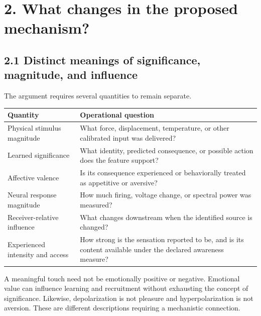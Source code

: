 \documentclass[
  american,
  11pt,
  letterpaper,
]{article}
\newcounter{none} %
\begin{document}
\section{2. What changes in the proposed mechanism?}\label{what-changes-in-the-proposed-mechanism}

\subsection{2.1 Distinct meanings of significance, magnitude, and influence}\label{distinct-meanings-of-significance-magnitude-and-influence}

The argument requires several quantities to remain separate.

{\def\LTcaptype{none} %
\begin{longtable}[]{@{}
  >{\raggedright\arraybackslash}p{}
  >{\raggedright\arraybackslash}p{}@{}}
\toprule\noalign{}
\begin{minipage}[b]{\linewidth}\raggedright
Quantity
\end{minipage} & \begin{minipage}[b]{\linewidth}\raggedright
Operational question
\end{minipage} \\
\midrule\noalign{}
\endhead
\bottomrule\noalign{}
\endlastfoot
Physical stimulus magnitude & What force, displacement, temperature, or other calibrated input was delivered? \\
Learned significance & What identity, predicted consequence, or possible action does the feature support? \\
Affective valence & Is its consequence experienced or behaviorally treated as appetitive or aversive? \\
Neural response magnitude & How much firing, voltage change, or spectral power was measured? \\
Receiver-relative influence & What changes downstream when the identified source is changed? \\
Experienced intensity and access & How strong is the sensation reported to be, and is its content available under the declared awareness measure? \\
\end{longtable}
}

A meaningful touch need not be emotionally positive or negative. Emotional value can influence learning and recruitment without exhausting the concept of significance. Likewise, depolarization is not pleasure and hyperpolarization is not aversion. These are different descriptions requiring a mechanistic connection.
\end{document}
